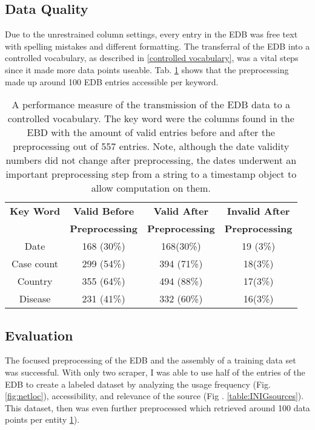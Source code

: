 \subsection{Data Quality}
  Due to the unrestrained column settings, every entry in the EDB was free text with spelling mistakes and different formatting. The transferral of the EDB into a controlled vocabulary, as described in \ref{controlled vocabulary}, was a vital steps since it made more data points useable. Tab. \ref{table:preprocessing performance} shows that the preprocessing made up around 100 EDB entries accessible per keyword.

\begin{table}
  \centering
  \caption{A performance measure of the transmission of the EDB data to a controlled vocabulary. The key word were the columns found in the EBD with the amount of valid entries before and after the preprocessing out of 557 entries. Note, although the date validity numbers did not change after preprocessing, the dates underwent an important preprocessing step from a string to a timestamp object to allow computation on them.}
  \begin{tabular}{@{}cccc@{}}
    \toprule
    \textbf{Key Word} & \textbf{Valid Before} & \textbf{Valid After} & \textbf{Invalid After} \\
    & \textbf{Preprocessing} & \textbf{Preprocessing} & \textbf{Preprocessing} \\
    \midrule
    Date& 168 (30\%)& 168(30\%)&  19 (3\%) \\
    Case count& 299 (54\%)& 394 (71\%)&  18(3\%) \\
    Country& 355 (64\%)& 494 (88\%)&  17(3\%) \\
    Disease& 231 (41\%)& 332 (60\%)& 16(3\%) \\
    \bottomrule
  \end{tabular}
\label{table:preprocessing performance}
\end{table}

\subsection{Evaluation}
  The focused preprocessing of the EDB and the assembly of a training data set was successful. With only two scraper, I was able to use half of the entries of the EDB to create a labeled dataset by analyzing the usage frequency (Fig. \ref{fig:netloc}), accessibility, and relevance of the source (Fig . \ref{table:INIGsources}). This dataset, then was even further preprocessed which retrieved around 100 data points per entity \ref{table:preprocessing performance}).

